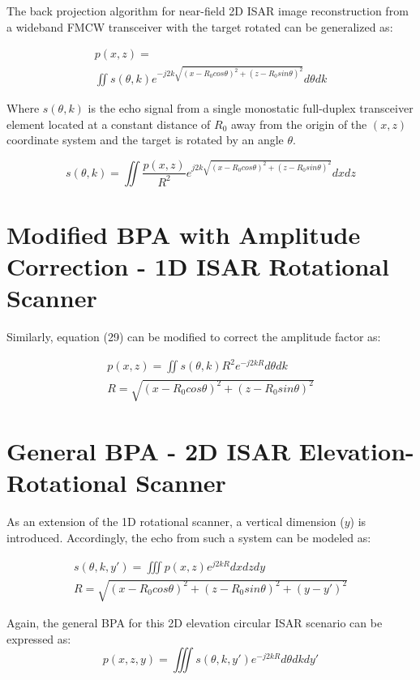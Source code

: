 \documentclass[conference]{IEEEtran}
\begin{document}
The back projection algorithm for near-field 2D ISAR image reconstruction from a wideband FMCW transceiver with the target rotated can be generalized as:

\begin{multline}
	p(x,z) = \\ \iint s(\theta,k) e^{-j2k\sqrt{(x - R_0cos\theta)^2 + (z - R_0sin\theta)^2}}d\theta dk
\end{multline}

Where $s(\theta,k)$ is the echo signal from a single monostatic full-duplex transceiver element located at a constant distance of $R_0$ away from the origin of the $(x,z)$ coordinate system and the target is rotated by an angle $\theta$.

\begin{equation}
	s(\theta,k) = \iint \frac{p(x,z)}{R^2}e^{j2k\sqrt{(x - R_0cos\theta)^2 + (z - R_0sin\theta)^2}} dxdz
\end{equation}

\section{Modified BPA with Amplitude Correction - 1D ISAR Rotational Scanner}
Similarly, equation (29) can be modified to correct the amplitude factor as:

\begin{gather}
	p(x,z) = \iint s(\theta,k) R^2 e^{-j2kR}d\theta dk \\
	R = \sqrt{(x - R_0cos\theta)^2 + (z - R_0sin\theta)^2}
\end{gather}

\section{General BPA - 2D ISAR Elevation-Rotational Scanner}
As an extension of the 1D rotational scanner, a vertical dimension ($y$) is introduced. Accordingly, the echo from such a system can be modeled as:

\begin{gather}
s(\theta,k,y') = \iiint p(x,z)e^{j2kR} dxdzdy \\
R = \sqrt{(x - R_0cos\theta)^2 + (z - R_0sin\theta)^2 + (y - y')^2}
\end{gather}

Again, the general BPA for this 2D elevation circular ISAR scenario can be expressed as:
\begin{equation}
	p(x,z,y) = \iiint s(\theta,k,y') e^{-j2kR} d\theta dk dy'
\end{equation}
\end{document}
